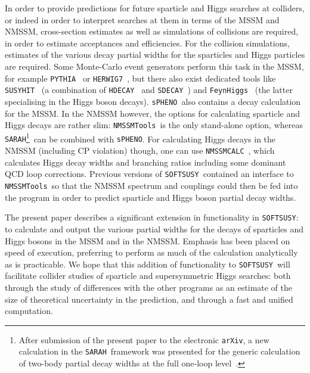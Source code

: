 \documentclass[final,3p,times,pdflatex]{elsarticle}
\def\code#1{{\tt #1}}
\begin{document}
In order to provide predictions for future sparticle and Higgs searches at
colliders, or indeed in order to interpret searches at them in terms 
of the MSSM and NMSSM, cross-section estimates as well as 
simulations of collisions are required, in order to
estimate acceptances and efficiencies. For the collision simulations,
estimates of the 
various decay partial widths for the sparticles and Higgs
particles are required. Some Monte-Carlo event generators perform this task in
the MSSM, for example \code{PYTHIA}~\cite{Sjostrand:2014zea} or
\code{HERWIG7}~\cite{Bahr:2008pv}, but 
there also exist dedicated tools like
\code{SUSYHIT}~\cite{Djouadi:2006bz} (a combination of \code{HDECAY}~\cite{Djouadi:1997yw} and
\code{SDECAY}~\cite{Djouadi:2005}) and
\code{FeynHiggs}~\cite{Heinemeyer:1998yj} (the latter specialising in the 
Higgs boson decays). \code{sPHENO}~also contains a decay
calculation for the MSSM\@. In the NMSSM however, the options for calculating
sparticle and 
Higgs decays are rather slim: \code{NMSSMTools}~is the only stand-alone
option, whereas \code{SARAH}\footnote{After submission of the present paper to
the electronic {\tt arXiv}, a new calculation in the \code{SARAH}~framework
was presented for the generic calculation of two-body partial decay widths at
the full one-loop level~\protect\cite{Goodsell:2017pdq}.}~can be combined with
\code{sPHENO}. For calculating Higgs decays in the NMSSM (including CP
violation) though, one can use \code{NMSSMCALC}~\cite{Baglio:2013iia}, which
calculates 
Higgs decay widths and branching ratios including some dominant QCD loop
corrections. 
Previous 
versions of \code{SOFTSUSY}~contained an interface to 
\code{NMSSMTools}~so that the NMSSM spectrum and couplings could then be fed
into the program in order to predict sparticle and Higgs boson partial decay
widths. 

The present paper describes a significant extension in functionality in
\code{SOFTSUSY}: to calculate and output the various partial widths for the
decays of sparticles and Higgs bosons in the MSSM and in the NMSSM\@. 
Emphasis has been placed on speed of execution, preferring to perform as much
of the calculation analytically as is practicable. 
We hope
that this addition of functionality to \code{SOFTSUSY}~will facilitate
collider studies of sparticle and supersymmetric 
Higgs searches: both through the study of differences with the other programs
as an estimate of the size of theoretical uncertainty in the prediction, and 
through a fast and unified computation. 
\end{document}
